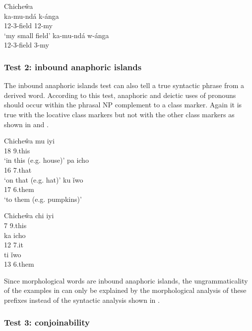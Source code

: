 \documentclass[output=paper,hidelinks]{langscibook}
\begin{document}
\ea\label{ex:African:7} Chiche\^wa\\
\ea 
   \gll ka-mu-ndá k-ánga\\
       12-3-field   12-my\\
   \glt ‘my small field’
\ex
   \gll *ka-mu-ndá w-ánga\\
   12-3-field    3-my\\
   \glt
\z
\z

\subsubsection{Test 2: inbound anaphoric islands}

The inbound anaphoric islands test can also tell a true syntactic phrase from a derived word. According to this test, anaphoric and deictic uses of pronouns should occur within the phrasal NP complement to a class marker. Again it is true with the locative class markers but not with the other class markers as shown in  and .

\ea\label{ex:African:8} Chiche\^wa
\ea\label{ex:African:8a}
    \gll mu iyi\\
        18  9.this\\
    \glt ‘in this (e.g. house)’
\ex
    \gll pa icho\\
    16 7.that\\
    \glt ‘on that (e.g. hat)’
\ex\label{ex:African:8c}
    \gll ku ǐwo\\
    17  6.them\\ 
    \glt ‘to them (e.g. pumpkins)’ 
\z
\z

\ea\label{ex:African:9} Chiche\^wa
\ea\label{ex:African:9a}
    \gll *chi iyi\\
        7    9.this\\
    \glt
\ex
    \gll  *ka icho\\
    12   7.it\\
    \glt
\ex\label{ex:African:9c}
    \gll *ti ǐwo\\
    13  6.them\\
    \glt
\z
\z

Since morphological words are inbound anaphoric islands, the ungrammaticality of the examples in  can only be explained by the morphological analysis of these prefixes instead of the syntactic analysis shown in .

\subsubsection{Test 3: conjoinability}
\end{document}
